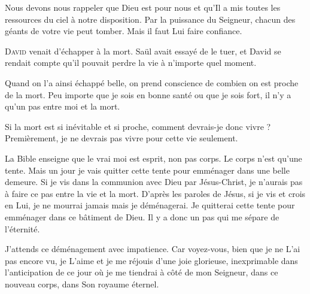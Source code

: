 Nous devons nous rappeler que Dieu est pour nous et qu'Il a mis
 toutes les ressources du ciel à notre disposition.
 Par la puissance du Seigneur, chacun des géants de votre vie peut tomber.
 Mais il faut Lui faire confiance. 

\dvrule







\lettrine{D}{avid} venait d'échapper à la mort.
 Saül avait essayé de le tuer, et David se rendait compte
 qu'il pouvait perdre la vie à n'importe quel moment.

Quand on l'a ainsi échappé belle, on prend conscience de combien
 on est proche de la mort.
 Peu importe que je sois en bonne santé ou que je sois fort,
 il n'y a qu'un pas entre moi et la mort.

Si la mort est si inévitable et si proche, comment devrais-je donc vivre ?
 Premièrement, je ne devrais pas vivre pour cette vie seulement.


La Bible enseigne que le vrai moi est esprit, non pas corps.
 Le corps n'est qu'une tente. Mais un jour je vais quitter cette tente
 pour emménager dans une belle demeure.
 Si je vis dans la communion avec Dieu par Jésus-Christ,
 je n'aurais pas à faire ce pas entre la vie et la mort.
 D'après les paroles de Jésus, si je vis et crois en Lui, je ne mourrai jamais
 \ocadr mais je déménagerai.
 Je quitterai cette tente pour emménager dans ce bâtiment de Dieu.
 Il y a donc un pas qui me sépare de l'éternité.

J'attends ce déménagement avec impatience.
 Car voyez-vous, bien que je ne L'ai pas encore vu,
 je L'aime et je me réjouis d'une joie glorieuse,
 inexprimable dans l'anticipation de ce jour où je me tiendrai
 à côté de mon Seigneur, dans ce nouveau corps, dans Son royaume éternel. 

